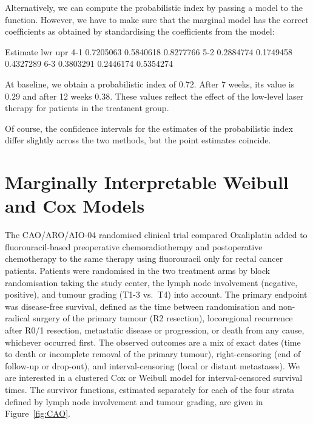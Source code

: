\documentclass[article,nojss,shortnames]{jss}\usepackage[]{graphicx}\usepackage[]{xcolor}
\begin{document}
Alternatively, we can compute the probabilistic index by passing a 
model to the  function. However, we have to make sure that the marginal
model has the correct coefficients as obtained by standardising the coefficients
from the  model:
\begin{Schunk}
\begin{Soutput}
     Estimate       lwr       upr
4-1 0.7205063 0.5840618 0.8277766
5-2 0.2884774 0.1749458 0.4327289
6-3 0.3803291 0.2446174 0.5354274
\end{Soutput}
\end{Schunk}
At baseline, we obtain a probabilistic index of $0.72$.
After 7 weeks, its value is $0.29$ and after 12 weeks
$0.38$. These values reflect the effect of the
low-level laser therapy for patients in the treatment group.

Of course, the confidence intervals for the estimates of the probabilistic index
differ slightly across the two methods, but the point estimates coincide.


\section{Marginally Interpretable Weibull and Cox Models}

The CAO/ARO/AIO-04 randomised clinical trial
\citep{Roedel_Graeven_Fietkau_2015} compared Oxaliplatin added to
fluorouracil-based preoperative chemoradiotherapy and postoperative
chemotherapy to the same therapy using fluorouracil only for rectal cancer
patients.  Patients were
randomised in the two treatment arms by block randomisation taking the study
center, the lymph node involvement (negative, positive), and tumour grading
(T1-3 vs.~T4) into account.  The primary endpoint was disease-free survival,
defined as the time between randomisation and non-radical surgery of the
primary tumour (R2 resection), locoregional recurrence after R0/1 resection,
metastatic disease or progression, or death from any cause, whichever
occurred first. The observed outcomes are a mix of exact dates (time to
death or incomplete removal of the primary tumour), right-censoring (end of
follow-up or drop-out), and interval-censoring (local or distant
metastases). We are interested in a clustered Cox or Weibull model for 
interval-censored survival times. The survivor functions, estimated
separately for each of the four strata defined by lymph node involvement and
tumour grading, are given in Figure~\ref{fig:CAO}.
\end{document}
